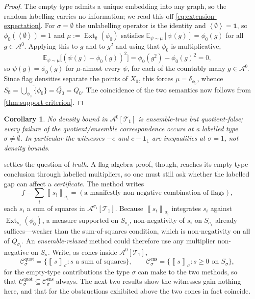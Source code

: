\documentclass[11pt]{article}
\newtheorem{corollary}[theorem]{Corollary}
\theoremstyle{definition}
\newcommand{\E}{\mathbb{E}}
\newcommand{\A}{\mathcal{A}}
\newcommand{\T}{\mathcal{T}}
\newcommand{\C}{\mathcal{C}}
\newcommand{\Ext}{\operatorname{Ext}}
\newcommand{\brak}[1]{\left\langle #1\right\rangle}
\newcommand{\avg}[2]{\left\llbracket #1 \right\rrbracket_{#2}}
\newcommand{\one}{\mathbf 1}
\begin{document}
\begin{proof}
The empty type admits a unique embedding into any graph, so the random labelling carries
no information; we read this off \eqref{eq:extension-expectation}.  For
$\sigma=\emptyset$ the unlabelling operator is the identity and $\brak\emptyset=\one$, so
$\phi_0(\brak\emptyset)=1$ and $\mu:=\Ext_\emptyset(\phi_0)$ satisfies
$\E_{\psi\sim\mu}[\psi(g)]=\phi_0(g)$ for all $g\in\A^0$.  Applying this to $g$ and to
$g^2$ and using that $\phi_0$ is multiplicative,
\[
  \E_{\psi\sim\mu}\bigl[(\psi(g)-\phi_0(g))^2\bigr]=\phi_0(g^2)-\phi_0(g)^2=0,
\]
so $\psi(g)=\phi_0(g)$ for $\mu$-almost every $\psi$, for each of the countably many
$g\in\A^0$.  Since flag densities separate the points of $X_0$, this forces
$\mu=\delta_{\phi_0}$, whence
$S_\emptyset=\overline{\bigcup_{\phi_0}\{\phi_0\}}=\overline{Q_0}=Q_0$.  The coincidence
of the two semantics now follows from \cref{thm:support-criterion}.
\end{proof}

\begin{corollary}\label{cor:confined}
No density bound in $\A^0[\T_1]$ is ensemble-true but quotient-false; every failure of
the quotient/ensemble correspondence occurs at a labelled type $\sigma\ne\emptyset$.  In
particular the witnesses $-e$ and $e-\one_1$ are inequalities at $\sigma=1$, not density
bounds.
\end{corollary}

 settles the question of \emph{truth}.  A flag-algebra proof, though,
reaches its empty-type conclusion through labelled multipliers, so one must still ask
whether the labelled gap can affect a \emph{certificate}.  The method writes
\[
  f-\sum_i\avg{s_i}{\sigma_i}=(\text{a manifestly non-negative combination of flags}),
\]
each $s_i$ a sum of squares in $\A^{\sigma_i}[\T_1]$.  Because $\avg{s_i}{\sigma_i}$
integrates $s_i$ against $\Ext_{\sigma_i}(\phi_0)$, a measure supported on
$S_{\sigma_i}$, non-negativity of $s_i$ on $S_{\sigma_i}$ already suffices---weaker than
the sum-of-squares condition, which is non-negativity on all of $Q_{\sigma_i}$.  An
\emph{ensemble-relaxed} method could therefore use any multiplier non-negative on
$S_\sigma$.  Write, as cones inside $\A^0[\T_1]$,
\[
  \C^{\mathrm{quot}}_\sigma=\{\avg{s}{\sigma}:s\text{ a sum of squares}\},
  \qquad
  \C^{\mathrm{ens}}_\sigma=\{\avg{s}{\sigma}:s\ge0\text{ on }S_\sigma\},
\]
for the empty-type contributions the type $\sigma$ can make to the two methods, so that
$\C^{\mathrm{quot}}_\sigma\subseteq\C^{\mathrm{ens}}_\sigma$ always.  The next two results
show the witnesses gain nothing here, and that for the obstructions exhibited above the
two cones in fact coincide.
\end{document}
